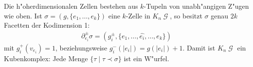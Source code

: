 \documentclass[paper=A4, twoside, chapterprefix=true, bibliography=totoc, headsepline]{scrbook}
\renewcommand{\thesection}{\arabic{section}}
\renewcommand*{\sectionmarkformat}{\thesection\autodot\enskip}
\DeclareMathOperator{\calG}{\mathcal{G}}
\newcommand{\G}{\calG}
\theoremstyle{break}
\theoremstyle{nonumberbreak}
\theoremstyle{emptybreak}
\theoremstyle{break}
\begin{document}
Die h"oherdimensionalen Zellen bestehen aus $k$-Tupeln von unabh"angigen Z"ugen wie oben.
Ist $\sigma = (g, \{e_1, \ldots, e_k\})$ eine $k$-Zelle in $K_n\G$, so besitzt $\sigma$ genau $2k$ Facetten der Kodimension 1:
\begin{align*}
	\partial_{e_i}^\pm \sigma = ( g_i^\pm, \{e_1, \ldots, \hat{e_i}, \ldots, e_k \})
\end{align*}
mit $g_i^+(v_{e_i}) = 1$, beziehungsweise $g_i^-(|e_i|) = g(|e_i|) + 1$.
Damit ist $K_n\G$ ein Kubenkomplex: Jede Menge $\{ \tau \mid \tau \prec \sigma \}$ ist ein W"urfel.





\appendix


\renewcommand*{\othersectionlevelsformat}[3]{\ifstr{#1}{section}{\"Ubung\ #3\ vom\ }{#3\autodot\enskip}}

\renewcommand*{\sectionmarkformat}{\"Ubung \thesection\autodot\ vom\enskip}


\printindex





\end{document}
